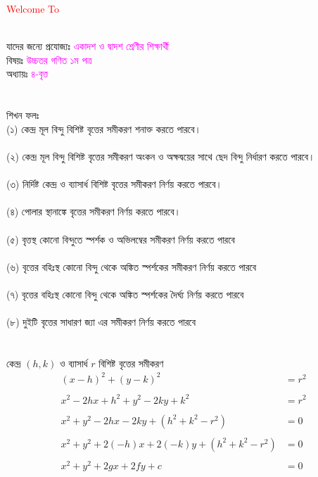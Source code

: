 \documentclass{article}
\begin{document}
 
	\Large
	\textcolor{red}{Welcome To} 
	\\
	\\
	যাদের জন্যে প্রযোজ্যঃ  	\textcolor{magenta}{একাদশ ও দ্বাদশ শ্রেণীর শিক্ষার্থী} \\
	বিষয়ঃ \textcolor{magenta}{উচ্চতর গণিত ১ম পত্র} \\
	অধ্যায়ঃ \textcolor{magenta}{৪-বৃত্ত}\\ 
	\\
	\\
	শিখন ফলঃ\\
	(১) কেন্দ্র মূল বিন্দু বিশিষ্ট বৃত্তের সমীকরণ শনাক্ত করতে পারবে। \\
	\\
	(২)  কেন্দ্র মূল বিন্দু বিশিষ্ট বৃত্তের সমীকরণ অংকন ও অক্ষদ্বয়ের সাথে ছেদ বিন্দু নির্ধারণ করতে পারবে। \\
	\\
	(৩) নির্দিষ্ট কেন্দ্র ও ব্যাসার্ধ বিশিষ্ট বৃত্তের  সমীকরণ নির্ণয় করতে পারবে। \\
	\\
	(৪) পোলার স্থানাঙ্কে বৃত্তের  সমীকরণ নির্ণয় করতে পারবে। \\
	\\
	(৫) বৃত্তস্থ কোনো বিন্দুতে স্পর্শক ও অভিলম্বের সমীকরণ নির্ণয় করতে পারবে\\ 
	\\
	(৬) বৃত্তের বহিঃস্থ কোনো বিন্দু থেকে অঙ্কিত স্পর্শকের সমীকরণ নির্ণয় করতে পারবে\\
	\\
	(৭) বৃত্তের বহিঃস্থ কোনো বিন্দু থেকে অঙ্কিত স্পর্শকের দৈর্ঘ্য নির্ণয় করতে পারবে\\
	\\
	(৮) দুইটি বৃত্তের সাধারণ জ্যা এর সমীকরণ নির্ণয় করতে পারবে\\ 
	\\ 
	\vspace{4cm}
	\\ 
	কেন্দ্র $(h,k)$  ও ব্যাসার্ধ $r$ বিশিষ্ট বৃত্তের সমীকরণ \\ 
	\begin{align*}
		(x-h)^2+(y-k)^2&=r^2\\
		\\
		x^2-2hx+h^2+y^2-2ky+k^2&=r^2\\
		\\
		x^2+y^2-2hx-2ky+(h^2+k^2-r^2)&=0\\
		\\
		x^2+y^2+2(-h)x+2(-k)y+(h^2+k^2-r^2)&=0\\
		\\
		x^2+y^2+2gx+2fy+c&=0
	\end{align*}
\end{document}
